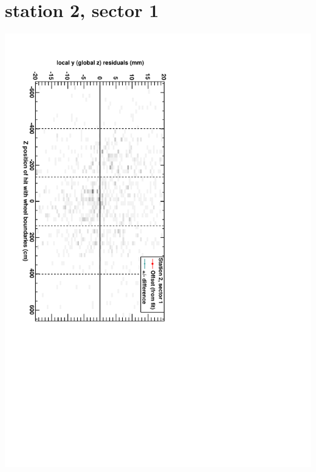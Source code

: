 \documentclass[compress]{beamer}
\begin{document}
\section*{station 2, sector 1}
\begin{frame} \vfill \mbox{\hspace{-1 cm}\includegraphics[height=1.2\linewidth, angle=90]{DTzVsZ_st2_sr01.pdf}} \end{frame}
\end{document}
